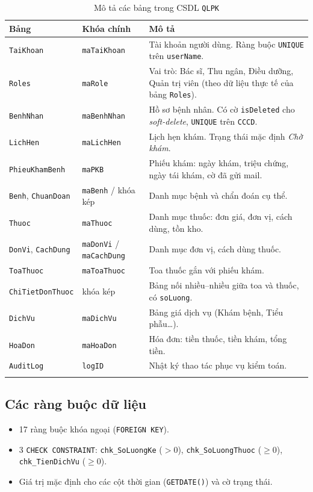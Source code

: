 \documentclass[12pt,a4paper]{report}
\begin{document}
\begin{longtable}{|p{3.2cm}|p{3cm}|p{8cm}|}
\hline
\textbf{Bảng} & \textbf{Khóa chính} & \textbf{Mô tả} \\
\hline\endhead
\texttt{TaiKhoan} & \texttt{maTaiKhoan} & Tài khoản người dùng. Ràng buộc \texttt{UNIQUE} trên \texttt{userName}. \\\hline
\texttt{Roles} & \texttt{maRole} & Vai trò: Bác sĩ, Thu ngân, Điều dưỡng, Quản trị viên (theo dữ liệu thực tế của bảng \texttt{Roles}). \\\hline
\texttt{BenhNhan} & \texttt{maBenhNhan} & Hồ sơ bệnh nhân. Có cờ \texttt{isDeleted} cho \emph{soft-delete}, \texttt{UNIQUE} trên \texttt{CCCD}. \\\hline
\texttt{LichHen} & \texttt{maLichHen} & Lịch hẹn khám. Trạng thái mặc định \emph{Chờ khám}. \\\hline
\texttt{PhieuKhamBenh} & \texttt{maPKB} & Phiếu khám: ngày khám, triệu chứng, ngày tái khám, cờ đã gửi mail. \\\hline
\texttt{Benh}, \texttt{ChuanDoan} & \texttt{maBenh} / khóa kép & Danh mục bệnh và chẩn đoán cụ thể. \\\hline
\texttt{Thuoc} & \texttt{maThuoc} & Danh mục thuốc: đơn giá, đơn vị, cách dùng, tồn kho. \\\hline
\texttt{DonVi}, \texttt{CachDung} & \texttt{maDonVi} / \texttt{maCachDung} & Danh mục đơn vị, cách dùng thuốc. \\\hline
\texttt{ToaThuoc} & \texttt{maToaThuoc} & Toa thuốc gắn với phiếu khám. \\\hline
\texttt{ChiTietDonThuoc} & khóa kép & Bảng nối nhiều--nhiều giữa toa và thuốc, có \texttt{soLuong}. \\\hline
\texttt{DichVu} & \texttt{maDichVu} & Bảng giá dịch vụ (Khám bệnh, Tiểu phẫu\ldots). \\\hline
\texttt{HoaDon} & \texttt{maHoaDon} & Hóa đơn: tiền thuốc, tiền khám, tổng tiền. \\\hline
\texttt{AuditLog} & \texttt{logID} & Nhật ký thao tác phục vụ kiểm toán. \\\hline
\caption{Mô tả các bảng trong CSDL \texttt{QLPK}}
\end{longtable}

\subsection{Các ràng buộc dữ liệu}

\begin{itemize}[leftmargin=*]
\item 17 ràng buộc khóa ngoại (\texttt{FOREIGN KEY}).
\item 3 \texttt{CHECK CONSTRAINT}: \texttt{chk\_SoLuongKe} ($>0$), \texttt{chk\_SoLuongThuoc} ($\geq 0$), \texttt{chk\_TienDichVu} ($\geq 0$).
\item Giá trị mặc định cho các cột thời gian (\texttt{GETDATE()}) và cờ trạng thái.
\end{itemize}
\end{document}
